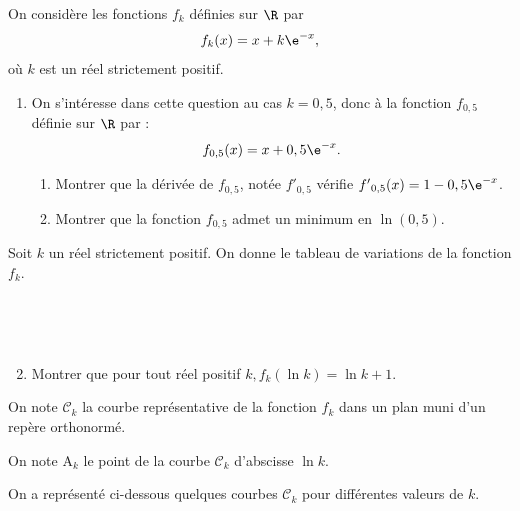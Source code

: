 On considère les fonctions $f_{k}$ définies sur $\R$ par 
\[f_{k}(x) = x + k \e^{-x},\]
 où $k$ est un réel strictement positif.

	\begin{enumerate}
		\item On s'intéresse dans cette question au cas $k = 0,5$, donc à la fonction $f_{0,5}$ définie sur $\R$ par :
\[f_{0,5}(x) = x + 0,5 \e^{-x}.\]

\smallskip
	\begin{enumerate}
		\item Montrer que la dérivée de $f_{0,5}$, notée $f'{ }_{0,5}$ vérifie $f'{ }_{0,5}(x) = 1-0,5 \e^{-x}$.

		\item Montrer que la fonction $f_{0,5}$ admet un minimum en $\ln (0,5)$.
	\end{enumerate}
\end{enumerate}

		Soit $k$ un réel strictement positif. On donne le tableau de variations de la fonction $f_{k}$.
		\medskip
		

					\hfill~\hfill~

	\begin{enumerate}
		\setcounter{enumi}{1}
		\item Montrer que pour tout réel positif $k, f_{k}(\ln k) = \ln k + 1$.
	\end{enumerate}

On note $\mathcal{C}_{k}$ la courbe représentative de la fonction $f_{k}$ dans un plan muni d'un repère orthonormé.

On note $\mathrm{A}_{k}$ le point de la courbe $\mathcal{C}_{k}$ d'abscisse $\ln k$.

On a représenté ci-dessous quelques courbes $\mathcal{C}_{k}$ pour différentes valeurs de $k$.

